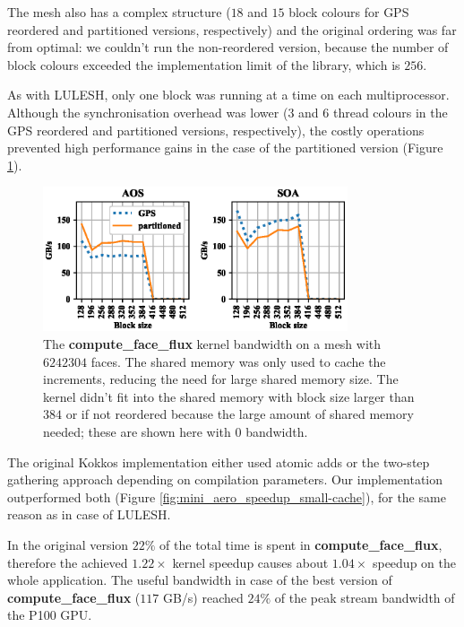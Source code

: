The mesh also has a complex structure ($18$ and $15$ block colours for GPS
reordered and partitioned versions, respectively) and the original ordering was
far from optimal: we couldn't run the non-reordered version, because the number
of block colours exceeded the implementation limit of the library, which is
$256$.

As with LULESH, only one block was running at a time on each multiprocessor.
Although the synchronisation overhead was lower ($3$ and $6$ thread
colours in the GPS reordered and partitioned versions, respectively), the costly
operations prevented high performance gains in the case of the partitioned
version (Figure \ref{fig:mini_aero_bw_small-cache}).

\begin{figure}[Htbp]
  \centering
  \includegraphics[width=9cm]{fig/mini_aero_bw_small-cache.eps}
  \caption{The \textbf{compute\_face\_flux} kernel bandwidth on a mesh with
  $6242304$ faces. The shared memory was only used to cache the increments,
  reducing the need for large shared memory size. The kernel didn't fit into the
  shared memory with block size larger than $384$ or if not reordered because
  the large amount of shared memory needed; these are shown here with $0$
  bandwidth.}
  \label{fig:mini_aero_bw_small-cache}
\end{figure}

The original Kokkos implementation either used atomic adds or the two-step
gathering approach depending on compilation parameters. Our implementation
outperformed both (Figure \ref{fig:mini_aero_speedup_small-cache}), for the same
reason as in case of LULESH.

In the original version $22\%$ of the total time is spent in
\textbf{compute\_face\_flux}, therefore the achieved $1.22\times$ kernel speedup
causes about $1.04\times$ speedup on the whole application. The useful bandwidth
in case of the best version of \textbf{compute\_face\_flux} ($117$ GB/s) reached
$24\%$ of the peak stream bandwidth of the P100 GPU.


